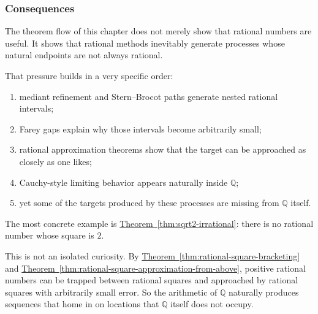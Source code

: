 
\subsubsection*{Consequences}

\begin{remark*}
The theorem flow of this chapter does not merely show that rational
numbers are useful. It shows that rational methods inevitably generate
processes whose natural endpoints are not always rational.

That pressure builds in a very specific order:
\begin{enumerate}
\item mediant refinement and Stern--Brocot paths generate nested
      rational intervals;
\item Farey gaps explain why those intervals become arbitrarily small;
\item rational approximation theorems show that the target can be
      approached as closely as one likes;
\item Cauchy-style limiting behavior appears naturally inside
      $\mathbb{Q}$;
\item yet some of the targets produced by these processes are missing
      from $\mathbb{Q}$ itself.
\end{enumerate}
\end{remark*}

\begin{remark*}
The most concrete example is
\hyperref[thm:sqrt2-irrational]{Theorem~\ref*{thm:sqrt2-irrational}}:
there is no rational number whose square is $2$.

This is not an isolated curiosity. By
\hyperref[thm:rational-square-bracketing]{Theorem~\ref*{thm:rational-square-bracketing}}
and
\hyperref[thm:rational-square-approximation-from-above]{Theorem~\ref*{thm:rational-square-approximation-from-above}},
positive rational numbers can be trapped between rational squares and
approached by rational squares with arbitrarily small error. So the
arithmetic of $\mathbb{Q}$ naturally produces sequences that home in on
locations that $\mathbb{Q}$ itself does not occupy.
\end{remark*}

